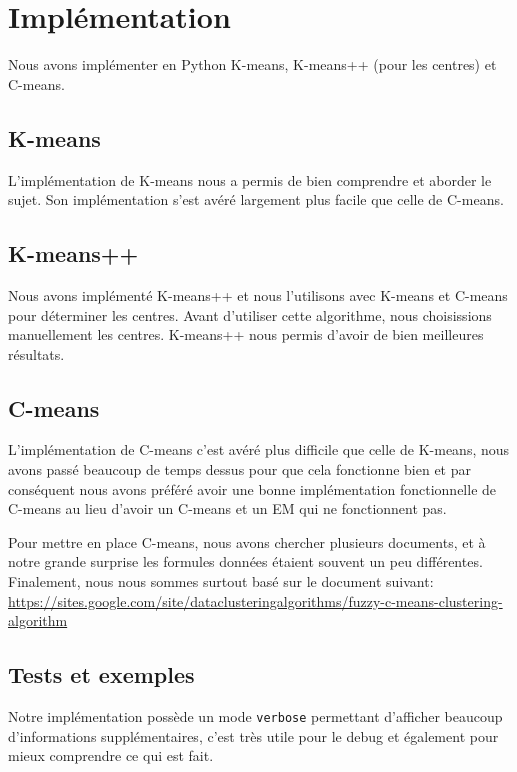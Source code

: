 \documentclass{article}
\begin{document}
  \section{Implémentation}

  Nous avons implémenter en Python K-means, K-means++ (pour les centres) et C-means.

  \subsection{K-means}

  L'implémentation de K-means nous a permis de bien comprendre et aborder le sujet.
  Son implémentation s'est avéré largement plus facile que celle de C-means.

  \subsection{K-means++}

  Nous avons implémenté K-means++ et nous l'utilisons avec K-means et C-means pour déterminer les centres.
  Avant d'utiliser cette algorithme, nous choisissions manuellement les centres.
  K-means++ nous permis d'avoir de bien meilleures résultats.


  \subsection{C-means}

  L'implémentation de C-means c'est avéré plus difficile que celle de K-means,
  nous avons passé beaucoup de temps dessus pour que cela fonctionne bien et
  par conséquent nous avons préféré avoir une bonne implémentation fonctionnelle
  de C-means au lieu d'avoir un C-means et un EM qui ne fonctionnent pas.

  Pour mettre en place C-means, nous avons chercher plusieurs documents, et
  à notre grande surprise les formules données étaient souvent un peu différentes.
  Finalement, nous nous sommes surtout basé sur le document suivant:
  \url{https://sites.google.com/site/dataclusteringalgorithms/fuzzy-c-means-clustering-algorithm}


  \subsection{Tests et exemples}

  Notre implémentation possède un mode \texttt{verbose} permettant d'afficher beaucoup
  d'informations supplémentaires, c'est très utile pour le debug et également pour mieux comprendre ce qui est fait.
\end{document}
